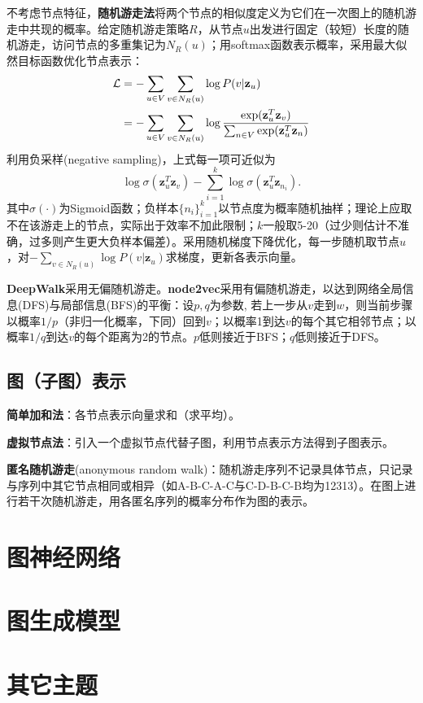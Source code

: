 \par 不考虑节点特征，\textbf{随机游走法}将两个节点的相似度定义为它们在一次图上的随机游走中共现的概率。给定随机游走策略$R$，从节点$u$出发进行固定（较短）长度的随机游走，访问节点的多重集记为$N_R(u)$；用softmax函数表示概率，采用最大似然目标函数优化节点表示：
\begin{align}
\mathcal{L}&=-\sum_{u\in V}\sum_{v \in N_R(u)} \log P(v \vert \mathbf{z}_u)\notag \\
&=-\sum_{u\in V}\sum_{v \in N_R(u)}\log \frac{\exp(\mathbf{z}_u^T \mathbf{z}_v)}{\sum_{n\in V}\exp(\mathbf{z}_u^T \mathbf{z}_n)}
\end{align}
利用负采样(negative sampling)，上式每一项可近似为
\begin{equation}
    \log \sigma(\mathbf{z}_u^T \mathbf{z}_v)-\sum_{i=1}^k \log \sigma(\mathbf{z}_u^T \mathbf{z}_{n_i}).
\end{equation}
其中$\sigma(\cdot)$为Sigmoid函数；负样本$\{n_i\}_{i=1}^k$以节点度为概率随机抽样；理论上应取不在该游走上的节点，实际出于效率不加此限制；$k$一般取5-20（过少则估计不准确，过多则产生更大负样本偏差）。采用随机梯度下降优化，每一步随机取节点$u$，对$-\sum_{v \in N_R(u)} \log P(v \vert \mathbf{z}_u)$求梯度，更新各表示向量。

\par \textbf{DeepWalk}采用无偏随机游走。\textbf{node2vec}采用有偏随机游走，以达到网络全局信息(DFS)与局部信息(BFS)的平衡：设$p,q$为参数, 若上一步从$v$走到$w$，则当前步骤以概率$1/p$（非归一化概率，下同）回到$v$；以概率1到达$v$的每个其它相邻节点；以概率$1/q$到达$v$的每个距离为2的节点。$p$低则接近于BFS；$q$低则接近于DFS。

\subsection{图（子图）表示}
\par \textbf{简单加和法}：各节点表示向量求和（求平均）。
\par \textbf{虚拟节点法}：引入一个虚拟节点代替子图，利用节点表示方法得到子图表示。
\par \textbf{匿名随机游走}(anonymous random walk)：随机游走序列不记录具体节点，只记录与序列中其它节点相同或相异（如A-B-C-A-C与C-D-B-C-B均为12313）。在图上进行若干次随机游走，用各匿名序列的概率分布作为图的表示。

\section{图神经网络}

\section{图生成模型}

\section{其它主题}
